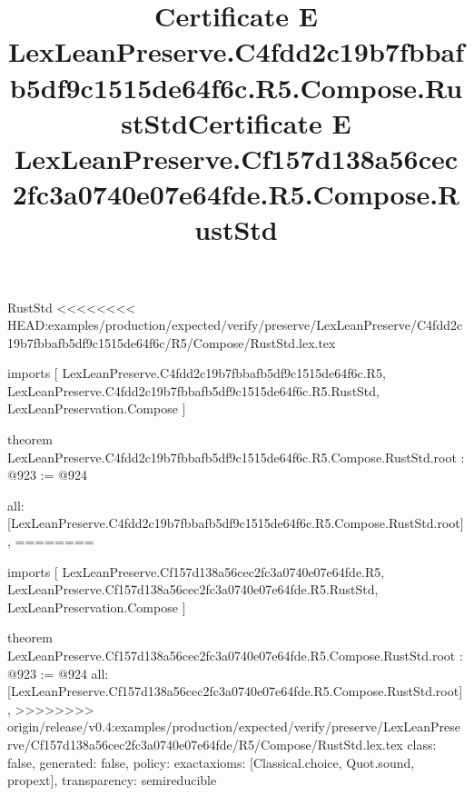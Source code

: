 \begin{lexlean}{RustStd}
<<<<<<<< HEAD:examples/production/expected/verify/preserve/LexLeanPreserve/C4fdd2c19b7fbbafb5df9c1515de64f6c/R5/Compose/RustStd.lex.tex
\title{Certificate E LexLeanPreserve.C4fdd2c19b7fbbafb5df9c1515de64f6c.R5.Compose.RustStd}
\begin{coremodule}
imports [
  LexLeanPreserve.C4fdd2c19b7fbbafb5df9c1515de64f6c.R5,
  LexLeanPreserve.C4fdd2c19b7fbbafb5df9c1515de64f6c.R5.RustStd,
  LexLeanPreservation.Compose
]

theorem LexLeanPreserve.C4fdd2c19b7fbbafb5df9c1515de64f6c.R5.Compose.RustStd.root : @923 := @924 {
  all: [LexLeanPreserve.C4fdd2c19b7fbbafb5df9c1515de64f6c.R5.Compose.RustStd.root],
========
\title{Certificate E LexLeanPreserve.Cf157d138a56cec2fc3a0740e07e64fde.R5.Compose.RustStd}
\begin{coremodule}
imports [
  LexLeanPreserve.Cf157d138a56cec2fc3a0740e07e64fde.R5,
  LexLeanPreserve.Cf157d138a56cec2fc3a0740e07e64fde.R5.RustStd,
  LexLeanPreservation.Compose
]

theorem LexLeanPreserve.Cf157d138a56cec2fc3a0740e07e64fde.R5.Compose.RustStd.root : @923 := @924 {
  all: [LexLeanPreserve.Cf157d138a56cec2fc3a0740e07e64fde.R5.Compose.RustStd.root],
>>>>>>>> origin/release/v0.4:examples/production/expected/verify/preserve/LexLeanPreserve/Cf157d138a56cec2fc3a0740e07e64fde/R5/Compose/RustStd.lex.tex
  class: false,
  generated: false,
  policy: exact{axioms: [Classical.choice, Quot.sound, propext]},
  transparency: semireducible
}


\end{coremodule}}
\end{coremodule}
\end{lexlean}
